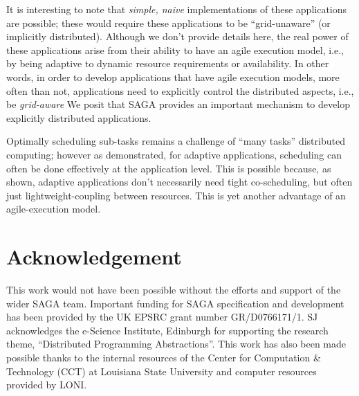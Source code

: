 \documentclass{llncs}
\begin{document}

It is interesting to note that {\it simple, naive} implementations of
these applications are possible; these would require these
applications to be ``grid-unaware'' (or implicitly distributed).
Although we don't provide details here, the real power of these
applications arise from their ability to have an agile execution
model, i.e., by being adaptive to dynamic resource requirements or
availability. In other words, in order to develop applications that
have agile execution models, more often than not, applications need to
explicitly control the distributed aspects, i.e., be {\it grid-aware}
We posit that SAGA provides an important mechanism to develop
explicitly distributed applications.


Optimally scheduling sub-tasks remains a challenge of ``many tasks''
distributed computing; however as demonstrated, for adaptive
applications, scheduling can often be done effectively at the
application level.  This is possible because, as shown, adaptive
applications don't necessarily need tight co-scheduling, but often
just lightweight-coupling between resources. This is yet another
advantage of an agile-execution model.



\up\upp

\section*{Acknowledgement}

\up\upp

This work would not have been possible without the efforts and support
of the wider SAGA team. Important funding for SAGA specification and
development has been provided by the UK EPSRC grant number
GR/D0766171/1.  SJ acknowledges the e-Science Institute, Edinburgh for
supporting the research theme, ``Distributed Programming
Abstractions''.  This work has also been made possible thanks to the
internal resources of the Center for Computation \& Technology (CCT)
at Louisiana State University and computer resources provided by LONI.

\up\upp



\end{document}
